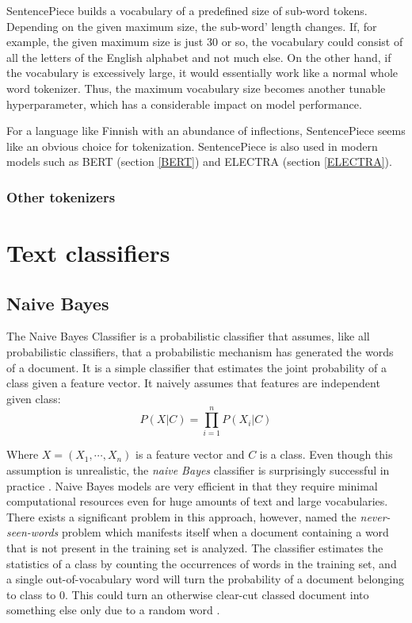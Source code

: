 SentencePiece builds a vocabulary of a predefined size of sub-word tokens.
Depending on the given maximum size, the sub-word' length changes.
If, for example, the given maximum size is just 30 or so, the vocabulary could consist of all the letters of the English alphabet and not much else.
On the other hand, if the vocabulary is excessively large, it would essentially work like a normal whole word tokenizer.
Thus, the maximum vocabulary size becomes another tunable hyperparameter, which has a considerable impact on model performance.

For a language like Finnish with an abundance of inflections, SentencePiece seems like an obvious choice for tokenization.
SentencePiece is also used in modern models such as BERT (section \ref{BERT}) and ELECTRA (section \ref{ELECTRA}).


\subsubsection{Other tokenizers} \label{Other tokenizers}


\section{Text classifiers} \label{Text classifiers}
\subsection{Naive Bayes} \label{Naive Bayes}
The Naive Bayes Classifier is a probabilistic classifier that assumes, like all probabilistic classifiers, that a probabilistic mechanism has generated the words of a document.
It is a simple classifier that estimates the joint probability of a class given a feature vector. It naively assumes that features are independent given class:
\begin{equation}
  P(X|C) = \prod_{i=1}^{n} P(X_{i}|C)
\end{equation}

Where $X = (X_{1},\cdots, X_{n})$ is a feature vector and $C$ is a class.
Even though this assumption is unrealistic, the \textit{naive Bayes} classifier is surprisingly successful in practice \cite{rish}.
Naive Bayes models are very efficient in that they require minimal computational resources even for huge amounts of text and large vocabularies.
There exists a significant problem in this approach, however, named the \textit{never-seen-words} problem which manifests itself when a document containing a word that is not present in the training set is analyzed. The classifier estimates the statistics of a class by counting the occurrences of words in the training set, and a single out-of-vocabulary word will turn the probability of a document belonging to class to 0. This could turn an otherwise clear-cut classed document into something else only due to a random word \cite{rigutini2004}.

